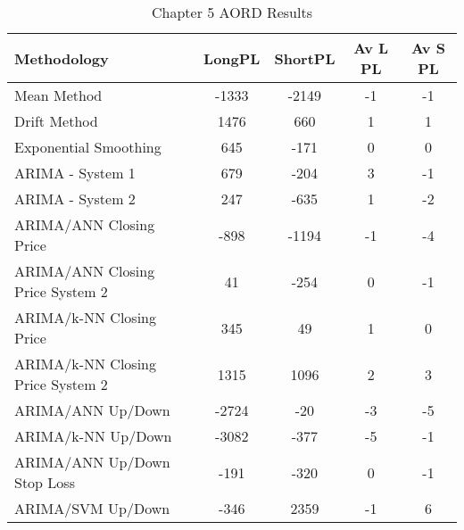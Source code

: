 \begin{table}[ht]
\centering
\caption[Chapter 5 AORD Results]{Chapter 5 AORD Results} 
\label{tab:chp6:aord2_summary}
\begin{tabular}{lcccc}
  \toprule Methodology & LongPL & ShortPL & Av L PL & Av S PL \\ 
  \midrule Mean Method & -1333 & -2149 & -1 & -1 \\ 
  Drift Method & 1476 & 660 & 1 & 1 \\ 
  Exponential Smoothing & 645 & -171 & 0 & 0 \\ 
  ARIMA - System 1 & 679 & -204 & 3 & -1 \\ 
  ARIMA - System 2 & 247 & -635 & 1 & -2 \\ 
  ARIMA/ANN Closing Price & -898 & -1194 & -1 & -4 \\ 
  ARIMA/ANN Closing Price System 2 & 41 & -254 & 0 & -1 \\ 
  ARIMA/k-NN Closing Price & 345 & 49 & 1 & 0 \\ 
  ARIMA/k-NN Closing Price System 2 & 1315 & 1096 & 2 & 3 \\ 
  ARIMA/ANN Up/Down & -2724 & -20 & -3 & -5 \\ 
  ARIMA/k-NN Up/Down & -3082 & -377 & -5 & -1 \\ 
  ARIMA/ANN Up/Down Stop Loss & -191 & -320 & 0 & -1 \\ 
  ARIMA/SVM Up/Down & -346 & 2359 & -1 & 6 \\ 
   \bottomrule \end{tabular}
\end{table}
